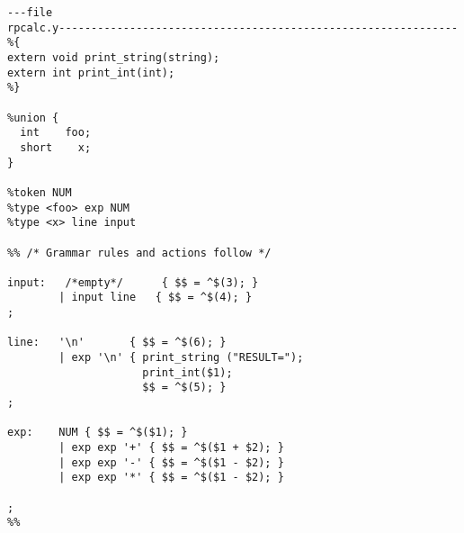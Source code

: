 \documentclass[titlepage,10pt]{article}
\begin{document}
\begin{verbatim}
---file
rpcalc.y-------------------------------------------------------------- 
%{ 
extern void print_string(string); 
extern int print_int(int); 
%} 

%union { 
  int    foo; 
  short    x; 
} 

%token NUM 
%type <foo> exp NUM 
%type <x> line input 

%% /* Grammar rules and actions follow */ 

input:   /*empty*/      { $$ = ^$(3); } 
        | input line   { $$ = ^$(4); } 
; 

line:   '\n'       { $$ = ^$(6); } 
        | exp '\n' { print_string ("RESULT="); 
                     print_int($1); 
                     $$ = ^$(5); } 
; 

exp:    NUM { $$ = ^$($1); } 
        | exp exp '+' { $$ = ^$($1 + $2); } 
        | exp exp '-' { $$ = ^$($1 - $2); } 
        | exp exp '*' { $$ = ^$($1 - $2); } 

; 
%% 
\end{verbatim}

\end{document}
